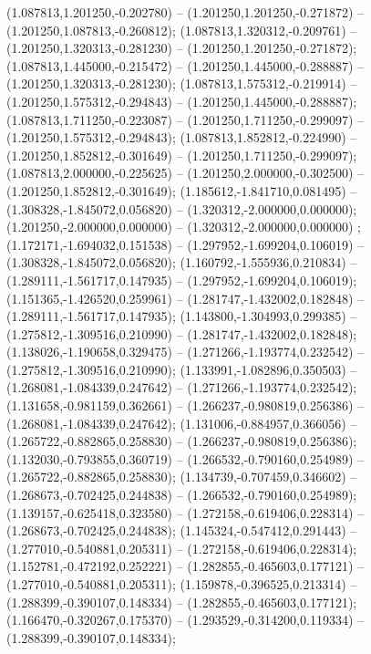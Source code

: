  (1.087813,1.201250,-0.202780) -- (1.201250,1.201250,-0.271872) -- (1.201250,1.087813,-0.260812);
 (1.087813,1.320312,-0.209761) -- (1.201250,1.320313,-0.281230) -- (1.201250,1.201250,-0.271872);
 (1.087813,1.445000,-0.215472) -- (1.201250,1.445000,-0.288887) -- (1.201250,1.320313,-0.281230);
 (1.087813,1.575312,-0.219914) -- (1.201250,1.575312,-0.294843) -- (1.201250,1.445000,-0.288887);
 (1.087813,1.711250,-0.223087) -- (1.201250,1.711250,-0.299097) -- (1.201250,1.575312,-0.294843);
 (1.087813,1.852812,-0.224990) -- (1.201250,1.852812,-0.301649) -- (1.201250,1.711250,-0.299097);
 (1.087813,2.000000,-0.225625) -- (1.201250,2.000000,-0.302500) -- (1.201250,1.852812,-0.301649);
 (1.185612,-1.841710,0.081495) -- (1.308328,-1.845072,0.056820) -- (1.320312,-2.000000,0.000000);
 (1.201250,-2.000000,0.000000) -- (1.320312,-2.000000,0.000000) ;
 (1.172171,-1.694032,0.151538) -- (1.297952,-1.699204,0.106019) -- (1.308328,-1.845072,0.056820);
 (1.160792,-1.555936,0.210834) -- (1.289111,-1.561717,0.147935) -- (1.297952,-1.699204,0.106019);
 (1.151365,-1.426520,0.259961) -- (1.281747,-1.432002,0.182848) -- (1.289111,-1.561717,0.147935);
 (1.143800,-1.304993,0.299385) -- (1.275812,-1.309516,0.210990) -- (1.281747,-1.432002,0.182848);
 (1.138026,-1.190658,0.329475) -- (1.271266,-1.193774,0.232542) -- (1.275812,-1.309516,0.210990);
 (1.133991,-1.082896,0.350503) -- (1.268081,-1.084339,0.247642) -- (1.271266,-1.193774,0.232542);
 (1.131658,-0.981159,0.362661) -- (1.266237,-0.980819,0.256386) -- (1.268081,-1.084339,0.247642);
 (1.131006,-0.884957,0.366056) -- (1.265722,-0.882865,0.258830) -- (1.266237,-0.980819,0.256386);
 (1.132030,-0.793855,0.360719) -- (1.266532,-0.790160,0.254989) -- (1.265722,-0.882865,0.258830);
 (1.134739,-0.707459,0.346602) -- (1.268673,-0.702425,0.244838) -- (1.266532,-0.790160,0.254989);
 (1.139157,-0.625418,0.323580) -- (1.272158,-0.619406,0.228314) -- (1.268673,-0.702425,0.244838);
 (1.145324,-0.547412,0.291443) -- (1.277010,-0.540881,0.205311) -- (1.272158,-0.619406,0.228314);
 (1.152781,-0.472192,0.252221) -- (1.282855,-0.465603,0.177121) -- (1.277010,-0.540881,0.205311);
 (1.159878,-0.396525,0.213314) -- (1.288399,-0.390107,0.148334) -- (1.282855,-0.465603,0.177121);
 (1.166470,-0.320267,0.175370) -- (1.293529,-0.314200,0.119334) -- (1.288399,-0.390107,0.148334);
